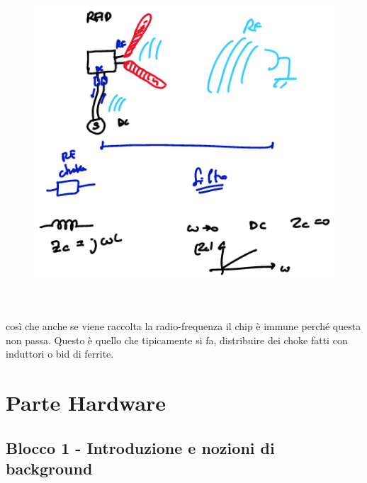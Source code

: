 \documentclass[oneside, 12pt]{extbook}
\begin{document}
\begin{figure}[!h]
	\includegraphics[scale=0.3]{immagini/schermi_chokes.png}
\end{figure}
\\\\così che anche se viene raccolta la radio-frequenza il chip è immune perché questa non passa. Questo è quello che tipicamente si fa, distribuire dei choke fatti con induttori o bid di ferrite.

\part{Parte Hardware}

\chapter{Blocco 1 - Introduzione e nozioni di background}
\end{document}
